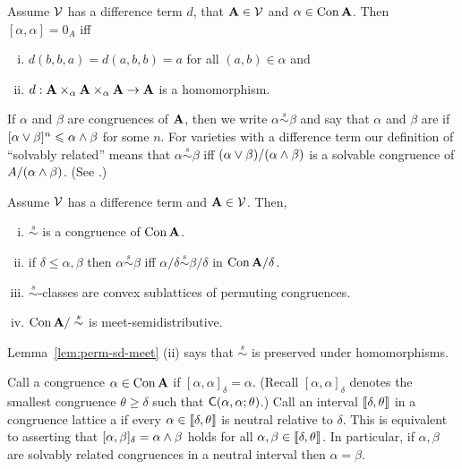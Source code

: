 \begin{lem}
  \label{lem:malcev-hom}
Assume $\mathcal{V}$ has a difference term $d$, that $\mathbf{A} \in \mathcal{V}$ and
$\alpha \in \operatorname{Con}\mathbf{A}$.  Then $[\alpha, \alpha] = 0_A$ iff
\begin{enumerate}[(i)]
\item $d(b,b,a) = d(a,b,b) = a$ for all $(a,b) \in \alpha$ and
\item $d: \mathbf{A} \times_\alpha\mathbf{A} \times_\alpha \mathbf{A} \to \mathbf{A}$ is a homomorphism.
\end{enumerate}
\end{lem}

\newcommand\solrel{\ensuremath{\stackrel{s}{\sim}}}
If $\alpha$ and $\beta$ are congruences of $\mathbf{A}$,
then we write $\alpha \solrel \beta$ and say that $\alpha$ and $\beta$ are
 if 
$[\alpha \vee \beta]^n \leqslant \alpha \wedge \beta$
for some $n$.
For varieties with a difference term our
definition of ``solvably related'' means that
$\alpha \solrel \beta$ iff $(\alpha \vee \beta)/(\alpha \wedge \beta)$
is a solvable congruence of $A/(\alpha\wedge \beta)$. (See \cite[Section 3]{MR1358491}.)

\begin{lem}
  \label{lem:perm-sd-meet}
Assume $\mathcal{V}$ has a difference term and $\mathbf{A} \in \mathcal{V}$. Then,
\begin{enumerate}[(i)]
\item $\solrel$ is a congruence of $\operatorname{Con} \mathbf{A}$.
\item if $\delta \leq \alpha, \beta$ then $\alpha \solrel \beta$ iff
  $\alpha/\delta \solrel \beta/\delta$ in $\operatorname{Con}\mathbf{A}/\delta$.
\item $\solrel$-classes are convex sublattices of permuting congruences.
\item $\Con\bA/\solrel$ is meet-semidistributive.
\end{enumerate}
\end{lem}
Lemma~\ref{lem:perm-sd-meet} (ii) says that $\solrel$ is
preserved under homomorphisms.

Call a congruence $\alpha \in \operatorname{Con} \mathbf{A}$  if
$[\alpha, \alpha]_\delta = \alpha$.  (Recall
$[\alpha, \alpha]_\delta$ denotes the smallest congruence $\theta \geq \delta$  such
that $\mathsf{C}(\alpha, \alpha; \theta)$.)
Call an interval $\llbracket \delta, \theta \rrbracket$ in a congruence lattice a
 if every $\alpha \in \llbracket \delta, \theta \rrbracket$ is neutral
relative to $\delta$.
This is equivalent to asserting that
$[\alpha, \beta]_\delta = \alpha \wedge \beta$ holds for all
$\alpha, \beta \in \llbracket \delta, \theta \rrbracket$.
In particular, if
$\alpha, \beta$ are solvably related congruences in a neutral interval 
then $\alpha = \beta$.

